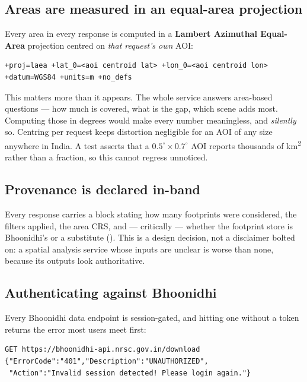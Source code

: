 \subsection{Areas are measured in an equal-area projection}

Every area in every response is computed in a \textbf{Lambert Azimuthal
Equal-Area} projection centred on \emph{that request's own} AOI:

\begin{lstlisting}
+proj=laea +lat_0=<aoi centroid lat> +lon_0=<aoi centroid lon>
+datum=WGS84 +units=m +no_defs
\end{lstlisting}

This matters more than it appears. The whole service answers area-based
questions --- how much is covered, what is the gap, which scene adds most.
Computing those in degrees would make every number meaningless, and
\emph{silently} so. Centring per request keeps distortion negligible for an AOI
of any size anywhere in India. A test asserts that a
$0.5^\circ\times0.7^\circ$ AOI reports thousands of km\textsuperscript{2}
rather than a fraction, so this cannot regress unnoticed.

\subsection{Provenance is declared in-band}

Every response carries a  block stating how many footprints
were considered, the filters applied, the area CRS, and --- critically ---
whether the footprint store is Bhoonidhi's or a substitute
(). This is a design decision, not a
disclaimer bolted on: a spatial analysis service whose inputs are unclear is
worse than none, because its outputs look authoritative.

\subsection{Authenticating against Bhoonidhi}

Every Bhoonidhi data endpoint is session-gated, and hitting one without a
token returns the error most users meet first:

\begin{lstlisting}
GET https://bhoonidhi-api.nrsc.gov.in/download
{"ErrorCode":"401","Description":"UNAUTHORIZED",
 "Action":"Invalid session detected! Please login again."}
\end{lstlisting}

